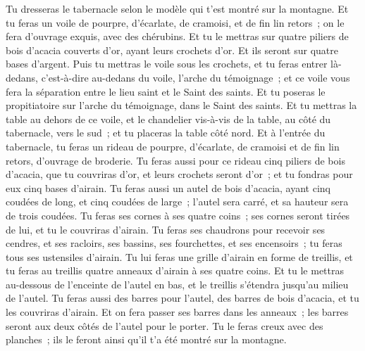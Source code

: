 \begin{multicols}{2}
Tu dresseras le tabernacle selon le modèle qui t'est montré sur la montagne.
Et tu feras un voile de pourpre, d'écarlate, de cramoisi, et de fin lin retors~; on le fera d'ouvrage exquis, avec des chérubins.
Et tu le mettras sur quatre piliers de bois d'acacia couverts d'or, ayant leurs crochets d'or. Et ils seront sur quatre bases d'argent.
Puis tu mettras le voile sous les crochets, et tu feras entrer là-dedans, c'est-à-dire au-dedans du voile, l'arche du témoignage~; et ce voile vous fera la séparation entre le lieu saint et le Saint des saints.
Et tu poseras le propitiatoire sur l'arche du témoignage, dans le Saint des saints.
Et tu mettras la table au dehors de ce voile, et le chandelier vis-à-vis de la table, au côté du tabernacle, vers le sud~; et tu placeras la table côté nord.
Et à l'entrée du tabernacle, tu feras un rideau de pourpre, d'écarlate, de cramoisi et de fin lin retors, d'ouvrage de broderie.
Tu feras aussi pour ce rideau cinq piliers de bois d'acacia, que tu couvriras d'or, et leurs crochets seront d'or~; et tu fondras pour eux cinq bases d'airain.
\VerseOne{}Tu feras aussi un autel de bois d'acacia, ayant cinq coudées de long, et cinq coudées de large~; l'autel sera carré, et sa hauteur sera de trois coudées.
Tu feras ses cornes à ses quatre coins~; ses cornes seront tirées de lui, et tu le couvriras d'airain.
Tu feras ses chaudrons pour recevoir ses cendres, et ses racloirs, ses bassins, ses fourchettes, et ses encensoirs~; tu feras tous ses ustensiles d'airain.
Tu lui feras une grille d'airain en forme de treillis, et tu feras au treillis quatre anneaux d'airain à ses quatre coins.
Et tu le mettras au-dessous de l'enceinte de l'autel en bas, et le treillis s'étendra jusqu'au milieu de l'autel.
Tu feras aussi des barres pour l'autel, des barres de bois d'acacia, et tu les couvriras d'airain.
Et on fera passer ses barres dans les anneaux~; les barres seront aux deux côtés de l'autel pour le porter.
Tu le feras creux avec des planches~; ils le feront ainsi qu'il t'a été montré sur la montagne.

\end{multicols}
